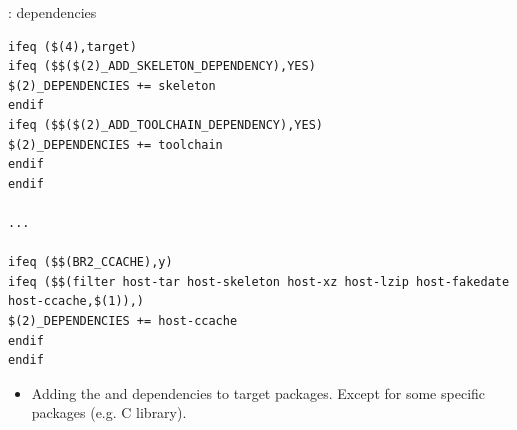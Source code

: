 \begin{frame}[fragile]{: dependencies}

\begin{block}{}
\begin{verbatim}
ifeq ($(4),target)
ifeq ($$($(2)_ADD_SKELETON_DEPENDENCY),YES)
$(2)_DEPENDENCIES += skeleton
endif
ifeq ($$($(2)_ADD_TOOLCHAIN_DEPENDENCY),YES)
$(2)_DEPENDENCIES += toolchain
endif
endif

...

ifeq ($$(BR2_CCACHE),y)
ifeq ($$(filter host-tar host-skeleton host-xz host-lzip host-fakedate host-ccache,$(1)),)
$(2)_DEPENDENCIES += host-ccache
endif
endif
\end{verbatim}
\end{block}

\begin{itemize}
\item Adding the  and  dependencies to
  target packages. Except for some specific packages (e.g. C library).
\end{itemize}
\end{frame}

